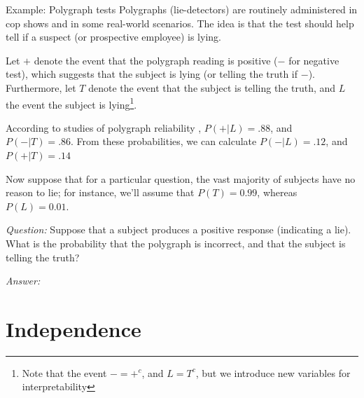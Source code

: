   \begin{frame}[allowframebreaks]{Example: Polygraph tests}
    Polygraphs (lie-detectors) are routinely administered in cop shows and in some real-world scenarios.
    The idea is that the test should help tell if a suspect (or prospective employee) is lying.
    
    Let $+$ denote the event that the polygraph reading is positive ($-$ for negative test), which suggests that the subject is lying (or telling the truth if $-$).
    Furthermore, let $T$ denote the event that the subject is telling the truth, and $L$ the event the subject is lying\footnote{Note that the event $- = +^c$, and $L = T^c$, but we introduce new variables for interpretability}.
    
    \framebreak 
    
    According to studies of polygraph reliability \citep{gastwirth87}, $P(+ | L) = .88$, and $P(-|T) = .86$.
    From these probabilities, we can calculate $P(- | L) = .12$, and $P(+ | T) = .14$
    
    Now suppose that for a particular question, the vast majority of subjects have no reason to lie; for instance, we'll assume that $P(T) = 0.99$, whereas $P(L) = 0.01$. 
    
    
    \emph{Question:} Suppose that a subject produces a positive response (indicating a lie). What is the probability that the polygraph is incorrect, and that the subject is telling the truth?
    
    \framebreak
    
    \emph{Answer:}
    
    
  \end{frame}
  
\section{Independence}

